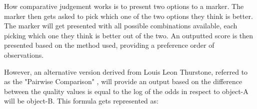 	
		
		
		

		How comparative judgement works is to present two options to a marker. The marker then gets asked to pick which one of the two options they think is better. The marker will get presented with all possible combinations available, each picking which one they think is better out of the two. An outputted score is then presented based on the method used, providing a preference order of observations. 
		
		However, an alternative version derived from Louis Leon Thurstone, referred to as the "Pairwise Comparison" \cite{thurstone1927law}, will provide an output based on the difference between the quality values is equal to the log of the odds in respect to object-A will be object-B. This formula gets represented as:
		
